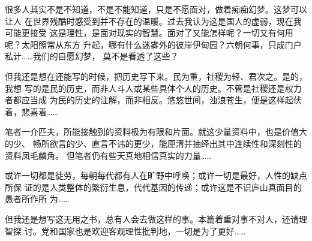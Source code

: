很多人其实不是不知道，不是不能知道，只是不愿面对，做着痴痴幻梦。这梦可以让人
在世界残酷时感受到并不存在的温暖。过去我认为这是国人的虚弱，现在我可能更接受
这是理性，是面对现实的智慧。面对了又能怎样呢？一切又有何用呢？太阳照常从东方
升起，哪有什么迷雾外的彼岸伊甸园？六朝何事，只成门户私计……我们的自愿幻梦，
莫不是看透了这些？

但我还是想在还能写的时候，把历史写下来。民为重，社稷为轻、君次之。是的，我想
写的是民的历史，而非人斗人或某些具体个人的历史。不管是社稷还是权力者都应当成
为民的历史的注解，而非相反。悠悠世间，浊浪苍生，便是这样起伏着，悲喜着……


笔者一介匹夫，所能接触到的资料极为有限和片面。就这少量资料中，也是价值大的少、
畅所欲言的少、直言不讳的更少，能厘清并抽绎出其中连续性和深刻性的资料凤毛麟角。
但笔者仍有些天真地相信真实的力量……

或许一切都是徒劳，每朝每代都有人在旷野中呼唤；或许一切是最好，人性的缺点所保
证的是人类整体的繁衍生息，代代基因的传递；或许这是不识庐山真面目的愚者所作所
为……

但我还是想写这无用之书，总有人会去做这样的事。本篇着重对事不对人，还请理智探
讨。党和国家也是欢迎客观理性批判地，一切是为了更好……










